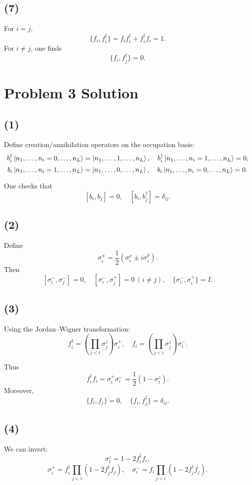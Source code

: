\documentclass[12pt]{article}
\begin{document}
\subsection*{(7)}
For $i=j$,
\[
\{f_i,f_i^\dagger\}=f_i f_i^\dagger+f_i^\dagger f_i=1.
\]
For $i\neq j$, one finds
\[
\{f_i,f_j^\dagger\}=0.
\]

\section*{Problem 3 Solution}

\subsection*{(1)}
Define creation/annihilation operators on the occupation basis:
\[
b_i^\dagger\ket{n_1,\dots,n_i=0,\dots,n_L}=\ket{n_1,\dots,1,\dots,n_L},\quad
b_i^\dagger\ket{n_1,\dots,n_i=1,\dots,n_L}=0,
\]
\[
b_i\ket{n_1,\dots,n_i=1,\dots,n_L}=\ket{n_1,\dots,0,\dots,n_L},\quad
b_i\ket{n_1,\dots,n_i=0,\dots,n_L}=0.
\]

One checks that
\[
[b_i,b_j]=0,\quad [b_i,b_j^\dagger]=\delta_{ij}.
\]

\subsection*{(2)}
Define
\[
\sigma_i^{\pm}=\frac{1}{2}(\sigma_i^x \pm i\sigma_i^y).
\]
Then
\[
[\sigma_i^-,\sigma_j^-]=0,\quad [\sigma_i^-,\sigma_j^+]=0\ (i\neq j),\quad
\{\sigma_i^-,\sigma_i^+\}=I.
\]

\subsection*{(3)}
Using the Jordan–Wigner transformation:
\[
f_i^\dagger = \left( \prod_{j<i} \sigma_j^z \right) \sigma_i^+,\quad
f_i = \left( \prod_{j<i} \sigma_j^z \right) \sigma_i^-.
\]

Thus
\[
f_i^\dagger f_i = \sigma_i^+ \sigma_i^- = \frac{1}{2}(1 - \sigma_i^z).
\]
Moreover,
\[
\{f_i, f_j\}=0,\quad \{f_i,f_j^\dagger\}=\delta_{ij}.
\]

\subsection*{(4)}
We can invert:
\[
\sigma_i^z = 1 - 2 f_i^\dagger f_i,
\]
\[
\sigma_i^+ = f_i^\dagger \prod_{j<i}(1-2f_j^\dagger f_j),\quad
\sigma_i^- = f_i \prod_{j<i}(1-2f_j^\dagger f_j).
\]
\end{document}
